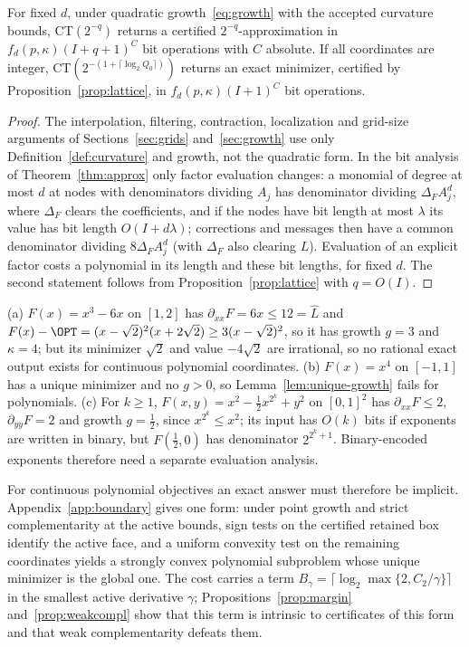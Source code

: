 \begin{corollary}\label{cor:poly}
For fixed $d$, under quadratic growth~\eqref{eq:growth} with the accepted
curvature bounds, CT$(2^{-q})$ returns a certified $2^{-q}$-approximation in
$f_d(p,\kappa)(I+q+1)^{C}$ bit operations with $C$ absolute. If all
coordinates are integer, CT$(2^{-(1+\lceil\log_2Q_0\rceil)})$ returns an exact
minimizer, certified by Proposition~\ref{prop:lattice}, in
$f_d(p,\kappa)(I+1)^C$ bit operations.
\end{corollary}

\begin{proof}
The interpolation, filtering, contraction, localization and grid-size
arguments of Sections~\ref{sec:grids} and~\ref{sec:growth} use only
Definition~\ref{def:curvature} and growth, not the quadratic form. In the bit
analysis of Theorem~\ref{thm:approx} only factor evaluation changes: a
monomial of degree at most $d$ at nodes with denominators dividing $A_j$ has
denominator dividing $\Delta_FA_j^d$, where $\Delta_F$ clears the coefficients, and
if the nodes have bit length at most $\lambda$ its value has bit length
$O(I+d\lambda)$; corrections and
messages then have a common denominator dividing $8\Delta_FA_j^{d}$ (with $\Delta_F$
also clearing $L$). Evaluation of an explicit factor costs a polynomial in
its length and these bit lengths, for fixed $d$. The second statement
follows from Proposition~\ref{prop:lattice} with $q=O(I)$.
\end{proof}

\begin{example}\label{ex:polylimits}
(a) $F(x)=x^3-6x$ on $[1,2]$ has $\partial_{xx}F=6x\le12=\hat L$ and
$F(x)-\OPT=(x-\sqrt2)^2(x+2\sqrt2)\ge3(x-\sqrt2)^2$, so it has growth $g=3$
and $\kappa=4$; but its minimizer $\sqrt2$ and value $-4\sqrt2$ are
irrational, so no rational exact output exists for continuous polynomial
coordinates. (b) $F(x)=x^4$ on $[-1,1]$ has a unique minimizer and no
$g>0$, so Lemma~\ref{lem:unique-growth} fails for polynomials.
(c) For $k\ge1$, $F(x,y)=x^2-\frac12x^{2^k}+y^2$ on $[0,1]^2$ has
$\partial_{xx}F\le2$, $\partial_{yy}F=2$ and growth $g=\frac12$, since
$x^{2^k}\le x^2$; its input has $O(k)$ bits if exponents are written in
binary, but $F(\frac12,0)$ has denominator $2^{2^k+1}$. Binary-encoded
exponents therefore need a separate evaluation analysis.
\end{example}

For continuous polynomial objectives an exact answer must therefore be
implicit. Appendix~\ref{app:boundary} gives one form: under point growth and
strict complementarity at the active bounds, sign tests on the certified
retained box identify the active face, and a uniform convexity test on the
remaining coordinates yields a strongly convex polynomial subproblem whose
unique minimizer is the global one. The cost carries a term
$B_\gamma=\lceil\log_2\max\{2,C_2/\gamma\}\rceil$ in the smallest active
derivative $\gamma$; Propositions~\ref{prop:margin} and~\ref{prop:weakcompl} show
that this term is intrinsic to certificates of this form and that weak
complementarity defeats them.

